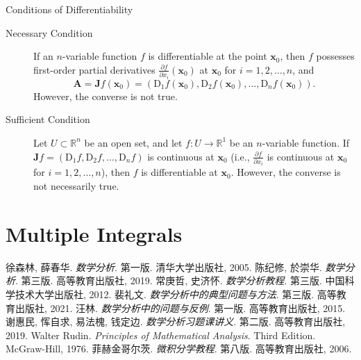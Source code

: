 \documentclass[11pt]{elegantbook}
\begin{document}
\begin{theorem}{Conditions of Differentiability}
    \begin{description}
        \item[Necessary Condition] If an \(n\)-variable function \(f\) is differentiable at the point \(\boldsymbol{x}_{0}\), 
        then \(f\) possesses first-order partial derivatives \(\frac{\partial f}{\partial x_{i}}(\boldsymbol{x}_{0})\) 
        at \(\boldsymbol{x}_{0}\) for \(i = 1, 2, \dots, n\), and
        \[
        \boldsymbol{A} = \boldsymbol{J}f(\boldsymbol{x}_{0}) = 
        \left(\mathrm{D}_{1}f(\boldsymbol{x}_{0}), \mathrm{D}_{2}f(\boldsymbol{x}_{0}), \dots, \mathrm{D}_{n}f(\boldsymbol{x}_{0}) \right).
        \]
        However, the converse is not true.
        \item[Sufficient Condition] Let \(U \subset \mathbb{R}^n\) be an open set, 
        and let \(f: U \to \mathbb{R}^1\) be an \(n\)-variable function. 
        If \(\boldsymbol{J}f = \left( \mathrm{D}_{1}f, \mathrm{D}_{2}f, \dots, \mathrm{D}_{n}f \right)\) 
        is continuous at \(\boldsymbol{x}_{0}\) 
        (i.e., \(\frac{\partial f}{\partial x_{i}}\) is continuous at \(\boldsymbol{x}_{0}\) for \(i = 1, 2, \dots, n\)), 
        then \(f\) is differentiable at \(\boldsymbol{x}_{0}\). 
        However, the converse is not necessarily true.
    \end{description}    
\end{theorem}

\chapter{Multiple Integrals}




\begin{thebibliography}{99} 
 徐森林, 薛春华. \emph{数学分析}. 第一版. 清华大学出版社, 2005.
 陈纪修, 於崇华. \emph{数学分析}. 第三版. 高等教育出版社, 2019.
 常庚哲, 史济怀. \emph{数学分析教程}. 第三版. 中国科学技术大学出版社, 2012.
 裴礼文. \emph{数学分析中的典型问题与方法}. 第三版. 高等教育出版社, 2021.
 汪林. \emph{数学分析中的问题与反例}. 第一版. 高等教育出版社, 2015.
 谢惠民, 恽自求, 易法槐, 钱定边. \emph{数学分析习题课讲义}. 第二版. 高等教育出版社, 2019.
 Walter Rudin. \emph{Principles of Mathematical Analysis}. Third Edition. McGraw-Hill, 1976.
 菲赫金哥尔茨. \emph{微积分学教程}. 第八版. 高等教育出版社, 2006.
\end{thebibliography}
\end{document}
